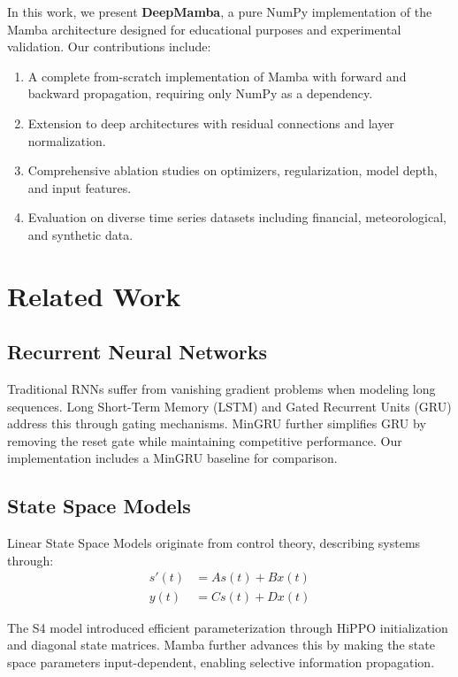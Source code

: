 \documentclass[11pt,a4paper]{article}
\begin{document}
In this work, we present \textbf{DeepMamba}, a pure NumPy implementation of the Mamba architecture designed for educational purposes and experimental validation. Our contributions include:

\begin{enumerate}
    \item A complete from-scratch implementation of Mamba with forward and backward propagation, requiring only NumPy as a dependency.
    \item Extension to deep architectures with residual connections and layer normalization.
    \item Comprehensive ablation studies on optimizers, regularization, model depth, and input features.
    \item Evaluation on diverse time series datasets including financial, meteorological, and synthetic data.
\end{enumerate}

\section{Related Work}

\subsection{Recurrent Neural Networks}

Traditional RNNs suffer from vanishing gradient problems when modeling long sequences. Long Short-Term Memory (LSTM) \cite{hochreiter1997long} and Gated Recurrent Units (GRU) \cite{cho2014learning} address this through gating mechanisms. MinGRU \cite{feng2024minGRU} further simplifies GRU by removing the reset gate while maintaining competitive performance. Our implementation includes a MinGRU baseline for comparison.

\subsection{State Space Models}

Linear State Space Models originate from control theory, describing systems through:
\begin{align}
    s'(t) &= As(t) + Bx(t) \\
    y(t) &= Cs(t) + Dx(t)
\end{align}

The S4 model \cite{gu2021efficiently} introduced efficient parameterization through HiPPO initialization and diagonal state matrices. Mamba \cite{gu2023mamba} further advances this by making the state space parameters input-dependent, enabling selective information propagation.
\end{document}
